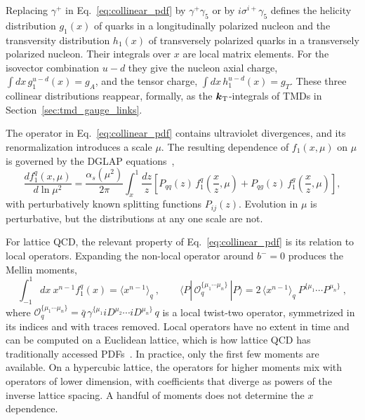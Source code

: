Replacing $\gamma^+$ in Eq.~\eqref{eq:collinear_pdf} by $\gamma^+\gamma_5$ or by $i\sigma^{i+}\gamma_5$ defines the helicity distribution $g_1(x)$ of quarks in a longitudinally polarized nucleon and the transversity distribution $h_1(x)$ of transversely polarized quarks in a transversely polarized nucleon. Their integrals over $x$ are local matrix elements. For the isovector combination $u-d$ they give the nucleon axial charge, $\int dx\,g_1^{u-d}(x) = g_A$, and the tensor charge, $\int dx\,h_1^{u-d}(x) = g_T$. These three collinear distributions reappear, formally, as the $\boldsymbol{k}_{\mathrm T}$-integrals of TMDs in Section~\ref{sec:tmd_gauge_links}.

The operator in Eq.~\eqref{eq:collinear_pdf} contains ultraviolet divergences, and its renormalization introduces a scale $\mu$. The resulting dependence of $f_1(x,\mu)$ on $\mu$ is governed by the DGLAP equations~\cite{Gribov:1972ri,Altarelli:1977zs,Dokshitzer:1977sg},
\begin{equation}
  \frac{d f_1^q(x,\mu)}{d\ln\mu^2} = \frac{\alpha_s(\mu^2)}{2\pi}\int_x^1\frac{dz}{z}\left[P_{qq}(z)\,f_1^q\!\left(\frac{x}{z},\mu\right) + P_{qg}(z)\,f_1^g\!\left(\frac{x}{z},\mu\right)\right] ,
\end{equation}
with perturbatively known splitting functions $P_{ij}(z)$. Evolution in $\mu$ is perturbative, but the distributions at any one scale are not.

For lattice QCD, the relevant property of Eq.~\eqref{eq:collinear_pdf} is its relation to local operators. Expanding the non-local operator around $b^- = 0$ produces the Mellin moments,
\begin{equation}
  \int_{-1}^{1}dx\ x^{n-1} f_1^q(x) = \langle x^{n-1}\rangle_q \ ,
  \qquad
  \langle P|\,\mathcal{O}_q^{\{\mu_1\cdots\mu_n\}}\,|P\rangle = 2\,\langle x^{n-1}\rangle_q\ P^{\{\mu_1}\cdots P^{\mu_n\}} \ ,
  \label{eq:mellin_moments}
\end{equation}
where $\mathcal{O}_q^{\{\mu_1\cdots\mu_n\}} = \bar{q}\,\gamma^{\{\mu_1} iD^{\mu_2}\cdots iD^{\mu_n\}}\,q$ is a local twist-two operator, symmetrized in its indices and with traces removed. Local operators have no extent in time and can be computed on a Euclidean lattice, which is how lattice QCD has traditionally accessed PDFs~\cite{Gockeler:1996mu,Lin:2017snn}. In practice, only the first few moments are available. On a hypercubic lattice, the operators for higher moments mix with operators of lower dimension, with coefficients that diverge as powers of the inverse lattice spacing. A handful of moments does not determine the $x$ dependence.

